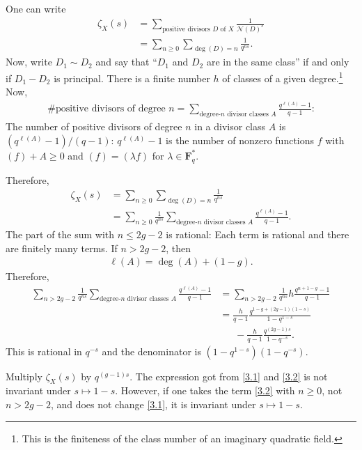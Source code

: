 \documentclass [11 pt, oneside] {article}
\begin{document}
One can write
\begin{align*}
	\zeta_{X}(s)&=  \sum_{\textrm{positive divisors $D$ of $X$}}^{} \frac{1}{\mathscr{N}(D) ^{s}}\\
		    &= \sum_{n\ge 0}^{} \sum_{\deg(D)=n}^{} \frac{1}{q^{ns}}.
\end{align*}
Now, write $D_1\sim D_2$ and say that ``$D_1$ and $D_2$ are in the same class'' if and only if $D_1-D_2$ is principal.
There is a finite number $h$ of classes of a given degree.\footnote{This is the finiteness of the class number of an imaginary quadratic field.}
Now,
\begin{align*}
	\#\textrm{positive divisors of degree $n$} = \sum_{\textrm{degree-$n$ divisor classes $A$}}^{} \frac{q^{\ell(A)} - 1}{q - 1}\textrm{:}
\end{align*}
The number of positive divisors of degree $n$ in a divisor class $A$ is $(q^{\ell(A)}-1)/(q-1)$: $q^{\ell(A)}-1$ is the number of nonzero functions $f$ with $(f)+A\ge 0$ and $(f)= (\lambda f)$ for $\lambda \in \mathbf{F}_{q}^{*}$.

Therefore,
\begin{align*}
	\zeta_{X}(s) &=  \sum_{n\ge 0}^{} \sum_{\deg(D)=n}^{} \frac{1}{q^{ns}}\\
		     &= \sum_{n\ge 0}^{} \frac{1}{q^{ns}} \sum_{\textrm{degree-$n$ divisor classes $A$}}^{}\frac{q^{\ell(A)}-1}{q-1}. 
\end{align*}
The part of the sum with $n\le 2g-2$ is rational: Each term is rational and there are finitely many terms.
If $n>2g-2$, then
\begin{align*}
	\ell(A) = \deg (A) +  (1-g).
\end{align*}
Therefore,
\begin{align}
	\sum_{n>2g-2}^{} \frac{1}{q^{ns}} \sum_{\textrm{degree-$n$ divisor classes $A$}}^{}\frac{q^{\ell(A)}-1}{q-1} &= \sum_{n>2g-2}^{} \frac{1}{q^{ns}} h \frac{q^{n+1-g}-1}{q-1}\nonumber\\
														     &= \frac{h}{q-1} \frac{q^{1-g+(2g-1) (1-s)}}{1-q^{1-s}}\label{3.1}\\
														     &\phantom{=}\  - \frac{h}{q-1}\frac{q^{(2g-1) s}}{1-q^{-s}}.\label{3.2}
\end{align}
This is rational in $q^{-s}$ and the denominator is $(1-q^{1-s}) (1-q^{-s})$.

Multiply $\zeta_{X}(s)$ by $q^{(g-1) s}$. The expression got from \cref{3.1} and \cref{3.2} is not invariant under $s\longmapsto 1-s$. However, if one takes the term \cref{3.2} with $n\ge 0$, not $n>2g-2$, and does not change \cref{3.1}, it is invariant under $s\longmapsto 1-s$.
\end{document}
